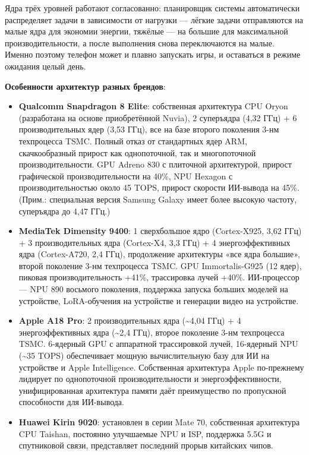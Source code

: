 Ядра трёх уровней работают согласованно: планировщик системы автоматически распределяет задачи в зависимости от нагрузки — лёгкие задачи отправляются на малые ядра для экономии энергии, тяжёлые — на большие для максимальной производительности, а после выполнения снова переключаются на малые. Именно поэтому телефон может и плавно запускать игры, и оставаться в режиме ожидания целый день.

\textbf{Особенности архитектур разных брендов}:

\begin{itemize}
  \item \textbf{Qualcomm Snapdragon 8 Elite}: собственная архитектура CPU Oryon (разработана на основе приобретённой Nuvia), 2 суперъядра (4,32 ГГц) + 6 производительных ядер (3,53 ГГц), все на базе второго поколения 3-нм техпроцесса TSMC. Полный отказ от стандартных ядер ARM, скачкообразный прирост как однопоточной, так и многопоточной производительности. GPU Adreno 830 с плиточной архитектурой, прирост графической производительности на 40\%, NPU Hexagon с производительностью около 45 TOPS, прирост скорости ИИ-вывода на 45\%. (Прим.: специальная версия Samsung Galaxy имеет более высокую частоту, суперъядра до 4,47 ГГц.)
  \item \textbf{MediaTek Dimensity 9400}: 1 сверхбольшое ядро (Cortex-X925, 3,62 ГГц) + 3 производительных ядра (Cortex-X4, 3,3 ГГц) + 4 энергоэффективных ядра (Cortex-A720, 2,4 ГГц), продолжение архитектуры «все ядра большие», второй поколение 3-нм техпроцесса TSMC. GPU Immortalis-G925 (12 ядер), пиковая производительность +41\%, трассировка лучей +40\%. ИИ-процессор — NPU 890 восьмого поколения, поддержка запуска больших моделей на устройстве, LoRA-обучения на устройстве и генерации видео на устройстве.
  \item \textbf{Apple A18 Pro}: 2 производительных ядра (\textasciitilde{}4,04 ГГц) + 4 энергоэффективных ядра (\textasciitilde{}2,4 ГГц), второе поколение 3-нм техпроцесса TSMC. 6-ядерный GPU с аппаратной трассировкой лучей, 16-ядерный NPU (\textasciitilde{}35 TOPS) обеспечивает мощную вычислительную базу для ИИ на устройстве и Apple Intelligence. Собственная архитектура Apple по-прежнему лидирует по однопоточной производительности и энергоэффективности, унифицированная архитектура памяти даёт преимущество по пропускной способности для ИИ-вывода.
  \item \textbf{Huawei Kirin 9020}: установлен в серии Mate 70, собственная архитектура CPU Taishan, постоянно улучшаемые NPU и ISP, поддержка 5.5G и спутниковой связи, представляет последний прорыв китайских чипов.
\end{itemize}


